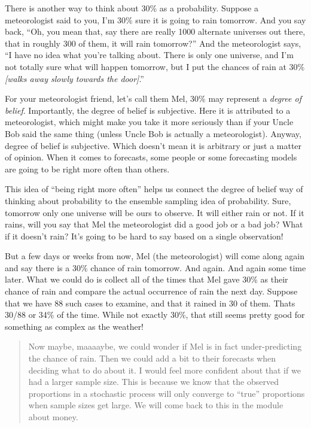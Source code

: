 \documentclass[openany]{book}
\begin{document}
There is another way to think about 30\% as a probability. Suppose a meteorologist said to you, I'm 30\% sure it is going to rain tomorrow. And you say back, ``Oh, you mean that, say there are really 1000 alternate universes out there, that in roughly 300 of them, it will rain tomorrow?'' And the meteorologist says, ``I have no idea what you're talking about. There is only one universe, and I'm not totally sure what will happen tomorrow, but I put the chances of rain at 30\% \emph{{[}walks away slowly towards the door{]}}.''

For your meteorologist friend, let's call them Mel, 30\% may represent a \emph{degree of belief}. Importantly, the degree of belief is subjective. Here it is attributed to a meteorologist, which might make you take it more seriously than if your Uncle Bob said the same thing (unless Uncle Bob is actually a meteorologist). Anyway, degree of belief is subjective. Which doesn't mean it is arbitrary or just a matter of opinion. When it comes to forecasts, some people or some forecasting models are going to be right more often than others.

This idea of ``being right more often'' helps us connect the degree of belief way of thinking about probability to the ensemble sampling idea of probability. Sure, tomorrow only one universe will be ours to observe. It will either rain or not. If it rains, will you say that Mel the meteorologist did a good job or a bad job? What if it doesn't rain? It's going to be hard to say based on a single observation!

But a few days or weeks from now, Mel (the meteorologist) will come along again and say there is a 30\% chance of rain tomorrow. And again. And again some time later. What we could do is collect all of the times that Mel gave 30\% as their chance of rain and compare the actual occurrence of rain the next day. Suppose that we have 88 such cases to examine, and that it rained in 30 of them. Thats 30/88 or 34\% of the time. While not exactly 30\%, that still seems pretty good for something as complex as the weather!

\begin{quote}
Now maybe, maaaaybe, we could wonder if Mel is in fact under-predicting the chance of rain. Then we could add a bit to their forecasts when deciding what to do about it. I would feel more confident about that if we had a larger sample size. This is because we know that the observed proportions in a stochastic process will only converge to ``true'' proportions when sample sizes get large. We will come back to this in the module about money.
\end{quote}
\end{document}
